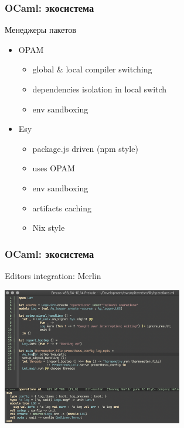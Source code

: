 \begin{frame}
  \frametitle{OCaml: экосистема}

  \Large Менеджеры пакетов
  \begin{itemize}
    \large
    \item OPAM
      \normalsize
      \begin{itemize}
        \item global \& local compiler switching
        \item dependencies isolation in local switch
        \item env sandboxing
      \end{itemize}
      \pause
    \large
    \item Esy
      \normalsize
      \begin{itemize}
        \item package.js driven (npm style)
        \item uses OPAM
        \item env sandboxing
        \item artifacts caching
        \item Nix style
      \end{itemize}
  \end{itemize}
\end{frame}

\begin{frame}
  \frametitle{OCaml: экосистема}

  \Large Editors integration: Merlin
  \begin{center}
    \includegraphics[height=6cm,keepaspectratio]{./images/merlin-shot-emacs.png}
  \end{center}
\end{frame}

